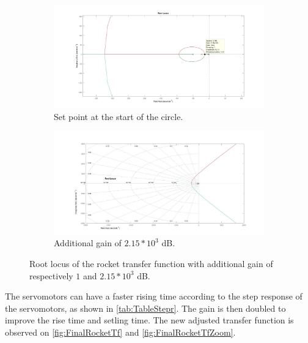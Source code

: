 \begin{figure}[htbp]
	\centering
	\begin{subfigure}{0.45\textwidth}
		\includegraphics[width=\textwidth]{figures/Rocket/design/tf_with_controller_1_zoom}
		\caption{Set point at the start of the circle.}
		\label{fig:SystemC1C2Zoom}
	\end{subfigure}
	\begin{subfigure}{0.45\textwidth}
		\centering
		\includegraphics[width=\textwidth]{figures/Rocket/design/tf_with_controller_215}
		\caption{Additional gain of $2.15*10^3$ \si{\dB}.}
		\label{fig:SystemGain215}
	\end{subfigure}
	\caption{Root locus of the rocket transfer function with additional gain of respectively $1$ and $2.15*10^3$ \si{\dB}.}
\end{figure}


The servomotors can have a faster rising time according to the step response of the servomotors, as shown in \autoref{tab:TableStepr}. The gain is then doubled to improve the rise time and setling time. The new adjusted transfer function is observed on \autoref{fig:FinalRocketTf} and \autoref{fig:FinalRocketTfZoom}.

